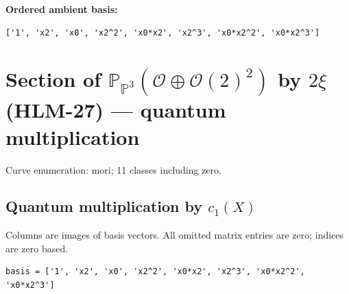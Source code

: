 \documentclass[10pt,a4paper]{article}
\begin{document}
\textbf{Ordered ambient basis:}
\begin{lstlisting}
['1', 'x2', 'x0', 'x2^2', 'x0*x2', 'x2^3', 'x0*x2^2', 'x0*x2^3']
\end{lstlisting}

\clearpage\section*{Section of $\mathbb P_{\mathbb P^{3}}(\mathcal O\oplus \mathcal O(2)^{2})$ by $2\xi $ (HLM-27) --- quantum multiplication}

Curve enumeration: mori; 11 classes including zero.
\subsection*{Quantum multiplication by $c_1(X)$}
Columns are images of basis vectors. All omitted matrix entries are zero; indices are zero based.

\begin{lstlisting}
basis = ['1', 'x2', 'x0', 'x2^2', 'x0*x2', 'x2^3', 'x0*x2^2', 'x0*x2^3']
\end{lstlisting}
\end{document}
